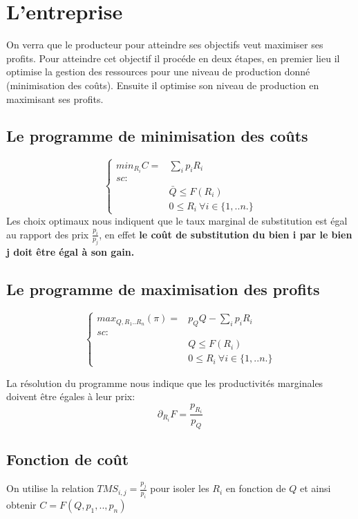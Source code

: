 \section{L'entreprise}

On verra que le producteur pour atteindre ses objectifs veut maximiser ses profits. Pour atteindre cet objectif il procéde en deux étapes, en premier lieu il optimise la gestion des ressources pour une niveau de production donné (minimisation des coûts). Ensuite il optimise son niveau de production en maximisant ses profits.

\subsection{Le programme de minimisation des coûts}

$$
\left\{
\begin{array}{cc}
 min_{R_i}C= & \sum_i p_iR_i  \\
 sc: & \\
 &\bar{Q} \leq F(R_i)\\
 & 0\leq R_i \ \forall i \in \{ 1,..n .\}
\end{array} 
\right.
$$
Les choix optimaux nous indiquent que le taux marginal de substitution est égal au rapport des prix $\frac{p_i}{p_j}$, en effet \textbf{le coût de substitution du bien i par le bien j doit être égal à son gain.}\\

\subsection{Le programme de maximisation des profits}


$$
\left\{
\begin{array}{cc}
 max_{Q,R_1..R_n}(\pi ) = & p_Q Q -\sum_i p_iR_i  \\
 sc: & \\
 & Q \leq F(R_i)\\
 & 0\leq R_i \ \forall i \in \{ 1,..n .\}
\end{array} 
\right.
$$

La résolution du programme nous indique que les productivités marginales doivent être égales à leur prix:
$$ \partial_{R_i} F = \frac{p_{R_i}}{p_Q}
$$

\subsection{Fonction de coût}

 On utilise la relation $TMS_{i,j}=\frac{p_j}{p_i}$ pour isoler les $R_i$ en fonction de $ Q$ et ainsi obtenir $C=F(Q,p_1,..,p_n)$
